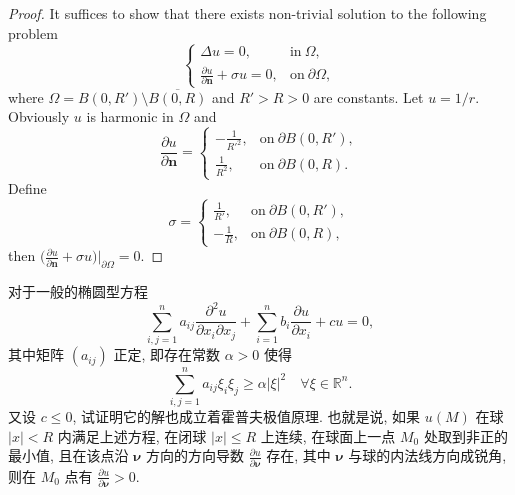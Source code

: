 \begin{proof}
  It suffices to show that there exists non-trivial solution to the following problem
  \[\begin{cases}
    \Delta u = 0, & \text{in}\ \varOmega, \\
    \frac{\partial u}{\partial \bm{n}}+\sigma u = 0, & \text{on}\ \partial\varOmega,
  \end{cases}\]
  where $\varOmega = B(0,R')\setminus\overline{B(0,R)}$ and $R'>R>0$ are constants.
  Let $u = 1/r$. Obviously $u$ is harmonic in $\varOmega$ and
  \[\frac{\partial u}{\partial \bm{n}} =
  \begin{cases}
     -\frac{1}{R'^2}, & \text{on}\ \partial B(0,R'), \\
     \frac{1}{R^2}, & \text{on}\ \partial B(0,R).
  \end{cases}\]
  Define
  \[ \sigma = \begin{cases}
    \frac{1}{R'}, & \text{on}\ \partial B(0,R'), \\
    -\frac{1}{R}, & \text{on}\ \partial B(0,R),
  \end{cases}\]
  then $\bigl(\frac{\partial u}{\partial \bm{n}}+\sigma u\bigr)\big|_{\partial\varOmega} = 0$.
\end{proof}


\begin{exercise}
  对于一般的椭圆型方程
  \[\sum_{i,j=1}^n a_{ij}\frac{\partial^2u}{\partial x_i\partial x_j}
    + \sum_{i=1}^n b_i \frac{\partial u}{\partial x_i} + cu = 0,\]
  其中矩阵 $(a_{ij})$ 正定, 即存在常数 $\alpha>0$ 使得
  \[\sum_{i,j=1}^n a_{ij}\xi_i\xi_j \geq \alpha|\xi|^2\quad
    \forall\xi\in \mathbb{R}^n.\]
  又设 $c\leq 0$, 试证明它的解也成立着霍普夫极值原理.
  也就是说, 如果 $u(M)$ 在球 $|x|<R$ 内满足上述方程, 在闭球 $|x|\leq R$ 上连续,
  在球面上一点 $M_0$ 处取到非正的最小值, 且在该点沿 $\bm{\nu}$ 方向的方向导数
  $\frac{\partial u}{\partial \bm{\nu}}$ 存在, 其中 $\bm{\nu}$ 与球的内法线方向成锐角,
  则在 $M_0$ 点有 $\frac{\partial u}{\partial \bm{\nu}}>0$.
\end{exercise}

